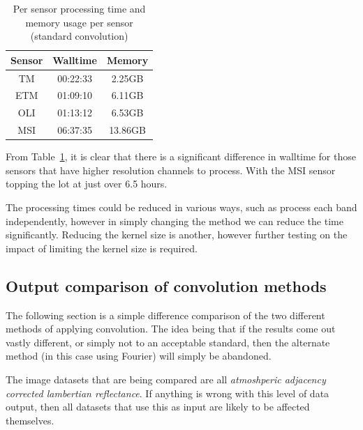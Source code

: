 \documentclass[a4paper]{article}
\begin{document}
    \begin{table}[ht!]
      \caption{Per sensor processing time and memory usage per sensor (standard convolution)}\label{table:3}
      \centering
      \begin{tabular}{ccc} \midrule
        \textbf{Sensor} & \textbf{Walltime} & \textbf{Memory} \\ \midrule
        TM & 00:22:33 & 2.25GB \\
        ETM & 01:09:10 & 6.11GB \\
        OLI & 01:13:12 & 6.53GB \\
        MSI & 06:37:35 & 13.86GB \\ \midrule
      \end{tabular}
    \end{table}

    \begin{flushleft}
      From Table~\ref{table:3}, it is clear that there is a significant difference in walltime for those sensors that have higher resolution channels to process. With the MSI sensor topping the lot at just over 6.5 hours. \par
      The processing times could be reduced in various ways, such as process each band independently, however in simply changing the method we can reduce the time significantly. Reducing the kernel size is another, however further testing on the impact of limiting the kernel size is required.
    \end{flushleft}

    \subsection{Output comparison of convolution methods}

    \begin{flushleft}
      The following section is a simple difference comparison of the two different methods of applying convolution. The idea being that if the results come out vastly different, or simply not to an acceptable standard, then the alternate method (in this case using Fourier) will simply be abandoned. \par
      The image datasets that are being compared are all \textit{atmoshperic adjacency corrected lambertian reflectance}. If anything is wrong with this level of data output, then all datasets that use this as input are likely to be affected themselves.
    \end{flushleft}
\end{document}
